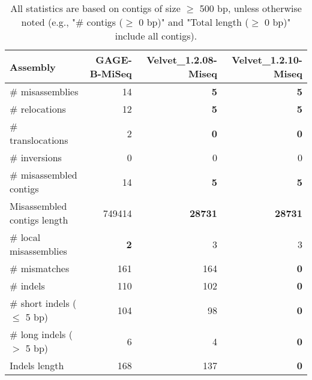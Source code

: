 \documentclass[12pt,a4paper]{article}
\begin{document}
\begin{table}[ht]
\begin{center}
\caption{All statistics are based on contigs of size $\geq$ 500 bp, unless otherwise noted (e.g., "\# contigs ($\geq$ 0 bp)" and "Total length ($\geq$ 0 bp)" include all contigs).}
\begin{tabular}{|l*{3}{|r}|}
\hline
Assembly & GAGE-B-MiSeq & Velvet\_1.2.08-Miseq & Velvet\_1.2.10-Miseq \\ \hline
\# misassemblies & 14 & {\bf 5} & {\bf 5} \\ \hline
\hspace{5mm}\# relocations & 12 & {\bf 5} & {\bf 5} \\ \hline
\hspace{5mm}\# translocations & 2 & {\bf 0} & {\bf 0} \\ \hline
\hspace{5mm}\# inversions & 0 & 0 & 0 \\ \hline
\# misassembled contigs & 14 & {\bf 5} & {\bf 5} \\ \hline
Misassembled contigs length & 749414 & {\bf 28731} & {\bf 28731} \\ \hline
\# local misassemblies & {\bf 2} & 3 & 3 \\ \hline
\# mismatches & 161 & 164 & {\bf 0} \\ \hline
\# indels & 110 & 102 & {\bf 0} \\ \hline
\hspace{5mm}\# short indels ($\leq$ 5 bp) & 104 & 98 & {\bf 0} \\ \hline
\hspace{5mm}\# long indels ($>$ 5 bp) & 6 & 4 & {\bf 0} \\ \hline
Indels length & 168 & 137 & {\bf 0} \\ \hline
\end{tabular}
\end{center}
\end{table}
\end{document}
